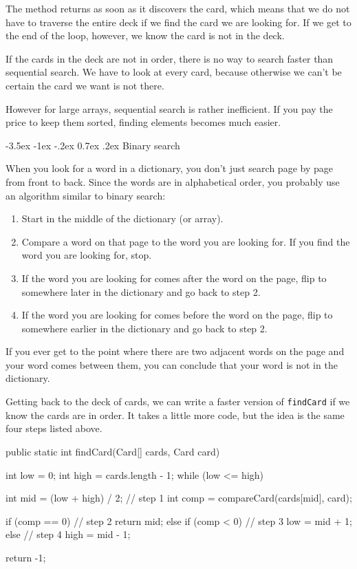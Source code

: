 \documentclass[12pt]{book}
\makeatletter
\theoremstyle{exercise}
\newcommand{\java}[1]{\verb"#1"}
\renewcommand{\section}{\@startsection {section}{1}{\z@}%
    {-3.5ex \@plus -1ex \@minus -.2ex}%
    {0.7ex \@plus.2ex}%
    {\normalfont\Large\bfseries}}
\newcommand{\java}[1]{\lstinline{#1}} %
\makeatother
\begin{document}

The method returns as soon as it discovers the card, which means that we do not have to traverse the entire deck if we find the card we are looking for.
If we get to the end of the loop, however, we know the card is not in the deck.

If the cards in the deck are not in order, there is no way to search faster than sequential search.
We have to look at every card, because otherwise we can't be certain the card we want is not there.

However for large arrays, sequential search is rather inefficient.
If you pay the price to keep them sorted, finding elements becomes much easier.


\section{Binary search}

When you look for a word in a dictionary, you don't just search page by page from front to back.
Since the words are in alphabetical order, you probably use an algorithm similar to binary search:

\begin{enumerate}
\item Start in the middle of the dictionary (or array).
\item Compare a word on that page to the word you are looking for.
If you find the word you are looking for, stop.
\item If the word you are looking for comes after the word on the page, flip to somewhere later in the dictionary and go back to step 2.
\item If the word you are looking for comes before the word on the page, flip to somewhere earlier in the dictionary and go back to step 2.
\end {enumerate}

If you ever get to the point where there are two adjacent words on the page and your word comes between them, you can conclude that your word is not in the dictionary.

Getting back to the deck of cards, we can write a faster version of \java{findCard} if we know the cards are in order.
It takes a little more code, but the idea is the same four steps listed above.

\begin{code}
public static int findCard(Card[] cards, Card card) {
    int low = 0;
    int high = cards.length - 1;
    while (low <= high) {
        int mid = (low + high) / 2;                   // step 1
        int comp = compareCard(cards[mid], card);

        if (comp == 0) {                              // step 2
            return mid;
        } else if (comp < 0) {                        // step 3
            low = mid + 1;
        } else {                                      // step 4
            high = mid - 1;
        }
    }
    return -1;
}
\end{code}
\end{document}
